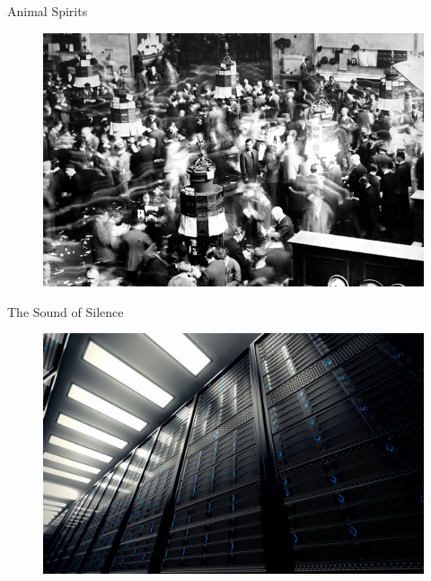 \begin{frame}{Animal Spirits}

	\begin{figure}
		\centering
		\includegraphics[width=0.7\linewidth]{Images/0_NYSE_1926}
	\end{figure}
\end{frame}


\begin{frame}{The Sound of Silence}
	\begin{figure}
		\centering
		\includegraphics[width=0.7\linewidth]{Images/1_servers}
	\end{figure}
\end{frame}



